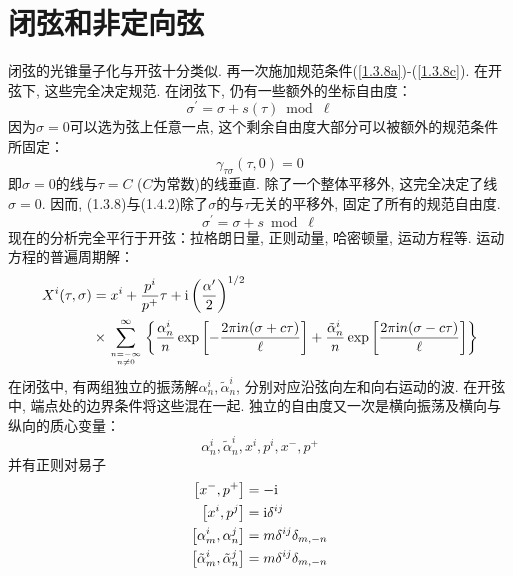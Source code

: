 \section{\texorpdfstring{闭弦和非定向弦}{1.4 Closed and unoriented strings}}
闭弦的光锥量子化与开弦十分类似. 再一次施加规范条件(\ref{1.3.8a})-(\ref{1.3.8c}). 在开弦下, 这些完全决定规范. 在闭弦下, 仍有一些额外的坐标自由度：
\begin{equation}
\sigma^{\prime}=\sigma+s(\tau) \bmod \ell
\end{equation}
因为$\sigma=0$可以选为弦上任意一点, 这个剩余自由度大部分可以被额外的规范条件所固定：
\begin{equation}
\gamma_{\tau \sigma}(\tau, 0)=0
\end{equation}
即$\sigma=0$的线与$\tau=C$ ($C$为常数)的线垂直. 除了一个整体平移外, 这完全决定了线$\sigma=0$. 因而, (1.3.8)与(1.4.2)除了$\sigma$的与$\tau$无关的平移外, 固定了所有的规范自由度. 
\begin{equation}
\sigma^{\prime}=\sigma+s \bmod \ell   \label{sigma-translation}
\end{equation}
现在的分析完全平行于开弦：拉格朗日量, 正则动量, 哈密顿量, 运动方程等. 运动方程的普遍周期解：
\begin{equation}
\begin{aligned}
X^{i}(\tau, \sigma) &=x^{i}+\frac{p^{i}}{p^{+}} \tau+\mathrm{i}\left(\frac{\alpha^{\prime}}{2}\right)^{1 / 2} \\
& \times \sum_{n=-\infty \atop n \neq 0}^{\infty}\left\{\frac{\alpha_{n}^{i}}{n} \exp \left[-\frac{2 \pi \mathrm{i} n(\sigma+c \tau)}{\ell}\right]+\frac{\tilde{\alpha}_{n}^{i}}{n} \exp \left[\frac{2 \pi \mathrm{i} n(\sigma-c \tau)}{\ell}\right]\right\} \label{general-periodic-solution}
\end{aligned}
\end{equation}
在闭弦中, 有两组独立的振荡解$\alpha_{n}^{i}, \tilde{\alpha}_{n}^{i}$, 分别对应沿弦向左和向右运动的波. 在开弦中, 端点处的边界条件将这些混在一起. 独立的自由度又一次是横向振荡及横向与纵向的质心变量：
\begin{equation}
\alpha_{n}^{i}, \tilde{\alpha}_{n}^{i}, x^{i}, p^{i}, x^{-}, p^{+}
\end{equation}
并有正则对易子
\begin{subequations}
\begin{align}
\left[x^{-}, p^{+}\right]&=-\mathrm{i} \\
\left[x^{i}, p^{j}\right]&=\mathrm{i} \delta^{i j} \\
\left[\alpha_{m}^{i}, \alpha_{n}^{j}\right]&=m \delta^{i j} \delta_{m,-n} \\
\left[\tilde{\alpha}_{m}^{i}, \tilde{\alpha}_{n}^{j}\right]&=m \delta^{i j} \delta_{m,-n} 
\end{align}
\end{subequations}
